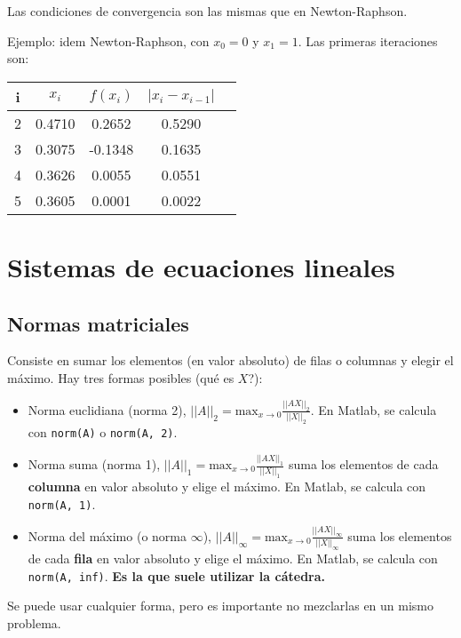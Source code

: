 \documentclass{article}
\begin{document}
Las condiciones de convergencia son las mismas que en Newton-Raphson.

Ejemplo: idem Newton-Raphson, con $x_0 = 0$ y $x_1 = 1$. Las primeras 
iteraciones son:

\begin{table}[h]
\centering
\begin{tabular}{ccccc}
    i & $x_i$  & $f(x_i)$ & $|x_i - x_{i-1}|$ \\\hline
    2 & 0.4710 & 0.2652   & 0.5290            \\
    3 & 0.3075 & -0.1348  & 0.1635            \\
    4 & 0.3626 & 0.0055   & 0.0551            \\
    5 & 0.3605 & 0.0001   & 0.0022
\end{tabular}
\end{table}

\section{Sistemas de ecuaciones lineales}

\subsection{Normas matriciales}

Consiste en sumar los elementos (en valor absoluto) de filas o columnas y elegir el máximo. Hay tres formas posibles (qué es $X$?):

\begin{itemize}
    \item Norma euclidiana (norma 2), $||A||_2 = \text{max}_{x\to0} \frac{||AX||_2}{||X||_2}$. En Matlab, se calcula con \verb|norm(A)| o \verb|norm(A, 2)|.
    \item Norma suma (norma 1), $||A||_1 = \text{max}_{x\to0} \frac{||AX||_1}{||X||_1}$ suma los elementos de cada \textbf{columna} en valor absoluto y elige el máximo. En Matlab, se calcula con \verb|norm(A, 1)|.
    \item Norma del máximo (o norma $\infty$), $||A||_\infty = \text{max}_{x\to0} \frac{||AX||_\infty}{||X||_\infty}$ suma los elementos de cada \textbf{fila} en valor absoluto y elige el máximo. En Matlab, se calcula con \verb|norm(A, inf)|. \textbf{Es la que suele utilizar la cátedra.}
\end{itemize}

Se puede usar cualquier forma, pero es importante no mezclarlas en un mismo problema.
\end{document}
